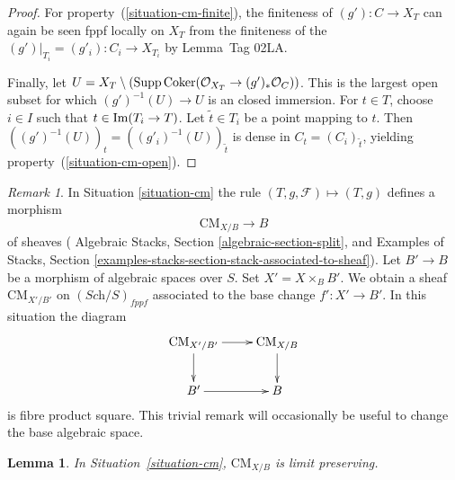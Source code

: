 \documentclass{stacks-project}
\theoremstyle{plain}
\newtheorem{lemma}[subsection]{Lemma}
\theoremstyle{definition}
\theoremstyle{remark}
\newtheorem{remark}[subsection]{Remark}
\numberwithin{equation}{subsection}
\def\Sch{\textit{Sch}}
\def\Im{\mathop{\rm Im}}
\def\Coker{\mathop{\rm Coker}}
\def\CMfunctor{\mathcal{C}\!{\it oh}}
\def\CMfunctor{\text{CM}}
\begin{document}
\begin{proof}
For property~(\ref{situation-cm-finite}), the finiteness of $(g') \colon C \to X_T$ can again be seen fppf locally on $X_T$ from the finiteness of the $(g')|_{T_i} = (g'_i) \colon C_i \to X_{T_i}$ by Lemma~Tag 02LA.

Finally, let $U = X_T \setminus (\text{Supp}\Coker(\mathcal{O}_{X_T} \to (g')_*\mathcal{O}_C))$.
This is the largest open subset for which $(g')^{-1}(U) \to U$ is an closed immersion.
For $t \in T$, choose $i \in I$ such that $t \in \Im(T_i \to T)$.
Let $\tilde{t} \in T_i$ be a point mapping to $t$.
Then $((g')^{-1}(U))_t = ((g'_i)^{-1}(U))_{\tilde{t}}$ is dense in $C_t = (C_{i})_{\tilde{t}}$, yielding property~(\ref{situation-cm-open}).
\end{proof}


\begin{remark}
	\label{remark-cm-base-change}
	In Situation \ref{situation-cm} the rule
$(T, g, \mathcal{F}) \mapsto (T, g)$ defines a morphism
$$
\CMfunctor_{X/B} \longrightarrow B
$$
of sheaves
( Algebraic Stacks, Section \ref{algebraic-section-split}, and
Examples of Stacks, Section
\ref{examples-stacks-section-stack-associated-to-sheaf}).
Let $B' \to B$ be a morphism of
algebraic spaces over $S$.
Set $X' = X \times_B B'$.
We obtain a sheaf $\CMfunctor_{X'/B'}$ on  $(\Sch/S)_{fppf}$
associated to the base change $f' : X' \to B'$. In this situation
the diagram
$$
\vcenter{
\xymatrix{
\CMfunctor_{X'/B'} \ar[r] \ar[d] & \CMfunctor_{X/B} \ar[d] \\
B' \ar[r] & B
}
}
$$
is fibre product square. This trivial remark
will occasionally be useful to change the base algebraic space.
\end{remark}
\begin{lemma}
    In Situation~\ref{situation-cm}, $\CMfunctor_{X/B}$ is limit preserving.
	\label{lemma-cm-limits}
\end{lemma}
\end{document}
